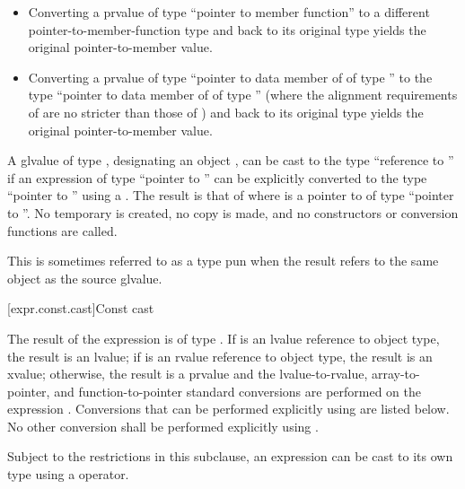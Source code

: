 \begin{itemize}
\item Converting a prvalue of type ``pointer to member function'' to a
different pointer-to-member-function type and back to its original type
yields the original pointer-to-member value.

\item Converting a prvalue of type ``pointer to data member of 
of type '' to the type ``pointer to data member of 
of type '' (where the alignment requirements of  are
no stricter than those of ) and back to its original type
yields the original pointer-to-member value.
\end{itemize}

\pnum
{}%
%
%
A glvalue of type ,
designating an object ,
can be cast to the type ``reference to ''
if an expression of type ``pointer to ''
can be explicitly converted to the type ``pointer to ''
using a .
The result is that of 
where  is a pointer to 
of type ``pointer to ''.
No temporary is created, no copy is made, and
no constructors or conversion
functions are called.
\begin{footnote}
This is sometimes referred to as a type pun
when the result refers to the same object as the source glvalue.
\end{footnote}

[expr.const.cast]{Const cast}

\pnum
{}%
%
The result of the expression  is of type
. If  is an lvalue reference to object type, the result is an
lvalue;
if  is an rvalue reference to object type, the result is an xvalue;
otherwise, the result is a prvalue and the
lvalue-to-rvalue, array-to-pointer,
and function-to-pointer standard conversions are
performed on the expression . Conversions that can be performed explicitly using
 are listed below. No other conversion shall be
performed explicitly using .

\pnum
\begin{note}
Subject to the restrictions in this subclause, an expression can be cast
to its own type using a  operator.
\end{note}

